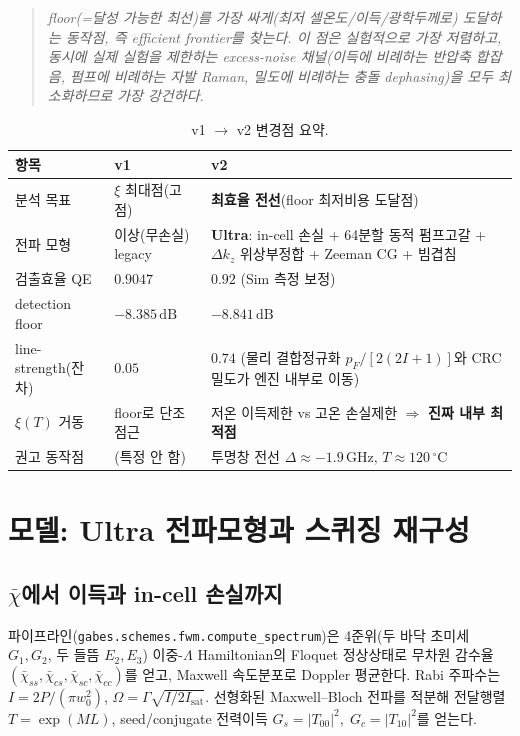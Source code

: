 \documentclass[11pt,a4paper]{article}
\newcommand{\dB}{\,\mathrm{dB}}
\newcommand{\GHz}{\,\mathrm{GHz}}
\newcommand{\degC}{\,^{\circ}\mathrm{C}}
\begin{document}
\begin{quote}\itshape
floor(=달성 가능한 최선)를 \emph{가장 싸게}(최저 셀온도/이득/광학두께로) 도달하는 동작점,
즉 efficient frontier를 찾는다. 이 점은 실험적으로 가장 저렴하고, 동시에 실제 실험을
제한하는 excess-noise 채널(이득에 비례하는 반압축 합잡음, 펌프에 비례하는 자발 Raman,
밀도에 비례하는 충돌 dephasing)을 모두 최소화하므로 \emph{가장 강건}하다.
\end{quote}

\begin{table}[h]
\centering
\caption{v1 $\to$ v2 변경점 요약.}
\label{tab:changelog}
\begin{tabular}{p{4.2cm}p{4.3cm}p{5.4cm}}
\toprule
항목 & v1 & v2\\
\midrule
분석 목표 & $\xi$ 최대점(고점) & \textbf{최효율 전선}(floor 최저비용 도달점)\\
전파 모형 & 이상(무손실) legacy & \textbf{Ultra}: in-cell 손실 + 64분할 동적 펌프고갈 + $\Delta k_z$ 위상부정합 + Zeeman CG + 빔겹침\\
검출효율 QE & $0.9047$ & $0.92$ (Sim 측정 보정)\\
detection floor & $-8.385\dB$ & $-8.841\dB$\\
line-strength(잔차) & $0.05$ & $0.74$ (물리 결합정규화 $p_F/[2(2I+1)]$와 CRC 밀도가 엔진 내부로 이동)\\
$\xi(T)$ 거동 & floor로 단조 점근 & 저온 이득제한 vs 고온 손실제한 $\Rightarrow$ \textbf{진짜 내부 최적점}\\
권고 동작점 & (특정 안 함) & 투명창 전선 $\Delta\approx-1.9\GHz,\,T\approx120\degC$\\
\bottomrule
\end{tabular}
\end{table}

\section{모델: Ultra 전파모형과 스퀴징 재구성}

\subsection{$\bar\chi$에서 이득과 in-cell 손실까지}
파이프라인(\texttt{gabes.schemes.fwm.compute\_spectrum})은 4준위(두 바닥 초미세 $G_1,G_2$,
두 들뜸 $E_2,E_3$) 이중-$\Lambda$ Hamiltonian의 Floquet 정상상태로 무차원 감수율
$(\bar\chi_{ss},\bar\chi_{cs},\bar\chi_{sc},\bar\chi_{cc})$를 얻고, Maxwell 속도분포로 Doppler
평균한다. Rabi 주파수는 $I=2P/(\pi w_0^2)$, $\Omega=\Gamma\sqrt{I/2I_{\mathrm{sat}}}$.
선형화된 Maxwell--Bloch 전파를 적분해 전달행렬 $T=\exp(ML)$, seed/conjugate 전력이득
$G_s=|T_{00}|^2,\;G_c=|T_{10}|^2$를 얻는다.
\end{document}
